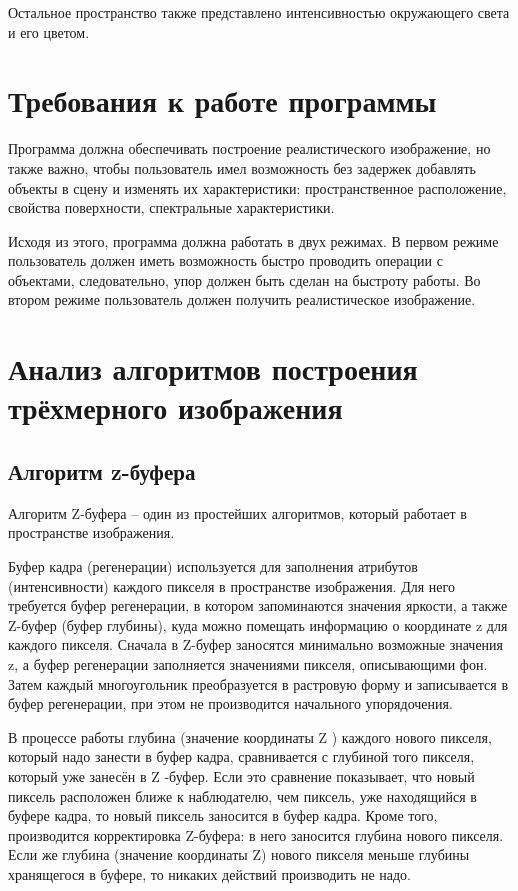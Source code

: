 Остальное пространство также представлено интенсивностью окружающего света и его цветом.

\section{Требования к работе программы}
Программа должна обеспечивать построение реалистического изображение, но также важно, чтобы пользователь имел возможность
без задержек добавлять объекты в сцену и изменять их характеристики: пространственное расположение, свойства поверхности,
спектральные характеристики.

Исходя из этого, программа должна работать в двух режимах. 
В первом режиме пользователь должен иметь возможность быстро проводить операции с объектами, следовательно, упор должен быть сделан на быстроту работы.
Во втором режиме пользователь должен получить реалистическое изображение. 

\section{Анализ алгоритмов построения трёхмерного изображения}

\subsection{Алгоритм z-буфера}
Алгоритм Z-буфера – один из простейших алгоритмов, который работает в пространстве изображения.

Буфер кадра (регенерации) используется для заполнения атрибутов (интенсивности) каждого пикселя в пространстве изображения. 
Для него требуется буфер регенерации, в котором запоминаются значения яркости, а также Z-буфер (буфер глубины), 
куда можно помещать информацию о координате z для каждого пикселя. 
Сначала в Z-буфер заносятся минимально возможные значения z, а буфер регенерации заполняется значениями пикселя, описывающими фон.
Затем каждый многоугольник преобразуется в растровую форму и записывается в буфер регенерации, при этом не производится начального упорядочения.


В процессе работы глубина (значение координаты Z ) каждого нового пикселя, который надо занести в буфер кадра, сравнивается с глубиной того пикселя, который уже занесён в Z -буфер. 
Если это сравнение показывает, что новый пиксель расположен ближе к наблюдателю, чем пиксель, уже находящийся в буфере кадра, 
то новый пиксель заносится в буфер кадра. 
Кроме того, производится корректировка Z-буфера: в него заносится глубина нового пикселя. 
Если же глубина (значение координаты Z) нового пикселя меньше глубины хранящегося в буфере, то никаких действий производить не надо.

